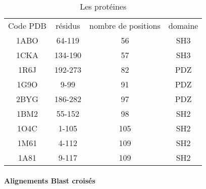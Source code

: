     \begin{table}[!htbp]
      \centering

      \begin{tabular}{cccc}

        \toprule
        Code PDB & résidus & nombre de positions & domaine\\
        \cmidrule{1-4}
        1ABO & 	64-119	 & 	56	 & SH3 \\
        1CKA & 	134-190	 & 	57	 & SH3 \\
        1R6J & 	192-273	 & 	82	 & PDZ \\
        1G9O & 	9-99	 & 	91	 & PDZ \\
        2BYG & 	186-282	 & 	97	 & PDZ \\
        1BM2 & 	55-152	 & 	98	 & SH2 \\
        1O4C & 	1-105	 & 	105	 & SH2 \\
        1M61 & 	4-112	 & 	109	 & SH2 \\
        1A81 & 	9-117	 & 	109	 & SH2 \\
        \bottomrule

      \end{tabular}      
      \caption{Les protéines}
\label{tab:protéines}      
    \end{table}




\paragraph{Alignements Blast croisés}


